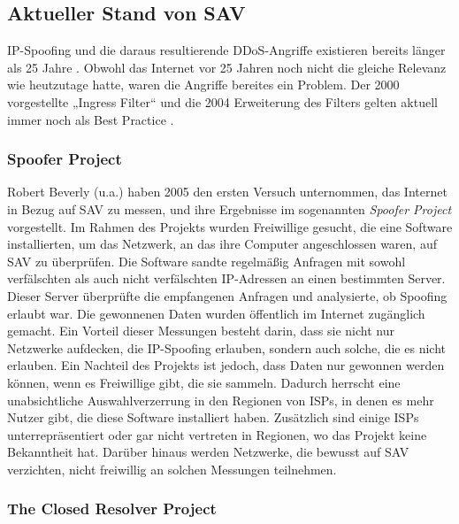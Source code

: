 \documentclass[sigplan,screen]{acmart}
\begin{document}
\subsection{Aktueller Stand von SAV}

IP-Spoofing und die daraus resultierende DDoS-Angriffe existieren bereits länger als 25 Jahre \cite{manrs01}. Obwohl das Internet vor 25 Jahren noch nicht die gleiche Relevanz wie heutzutage hatte, waren die Angriffe bereites ein Problem. Der 2000 vorgestellte „Ingress Filter“ \cite{Ingress01} und die 2004 Erweiterung des Filters \cite{Bcp84} gelten aktuell immer noch als Best Practice \cite{CRP01} \cite{Lone01} \cite{Hal01} \cite{manrs01}.  

\subsubsection{Spoofer Project}

Robert Beverly (u.a.) \cite{Spoofer01} haben 2005 den ersten Versuch unternommen, das Internet in Bezug auf SAV zu messen, und ihre Ergebnisse im sogenannten \textit{Spoofer Project} vorgestellt. Im Rahmen des Projekts wurden Freiwillige gesucht, die eine Software installierten, um das Netzwerk, an das ihre Computer angeschlossen waren, auf SAV zu überprüfen. Die Software sandte regelmäßig Anfragen mit sowohl verfälschten als auch nicht verfälschten IP-Adressen an einen bestimmten Server. Dieser Server überprüfte die empfangenen Anfragen und analysierte, ob Spoofing erlaubt war. Die gewonnenen Daten wurden öffentlich im Internet zugänglich gemacht. Ein Vorteil dieser Messungen besteht darin, dass sie nicht nur Netzwerke aufdecken, die IP-Spoofing erlauben, sondern auch solche, die es nicht erlauben. Ein Nachteil des Projekts ist jedoch, dass Daten nur gewonnen werden können, wenn es Freiwillige gibt, die sie sammeln. Dadurch herrscht eine unabsichtliche Auswahlverzerrung in den Regionen von ISPs, in denen es mehr Nutzer gibt, die diese Software installiert haben. Zusätzlich sind einige ISPs unterrepräsentiert oder gar nicht vertreten in Regionen, wo das Projekt keine Bekanntheit hat. Darüber hinaus werden Netzwerke, die bewusst auf SAV verzichten, nicht freiwillig an solchen Messungen teilnehmen.

\subsubsection{The Closed Resolver Project}
\end{document}
